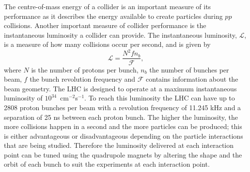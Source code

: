 The centre-of-mass energy of a collider is an important measure of its performance as it describes the energy available to create particles during $pp$ collisions. Another important measure of collider performance is the instantaneous luminosity a collider can provide. The instantaneous luminosity, $\mathcal{L}$, is a measure of how many collisions occur per second, and is given by
\begin{equation}
\mathcal{L} = \frac{N^{2} f n_{b}}{\mathcal{F}},
\label{eq:inst_lumi}
\end{equation}
where $N$ is the number of protons per bunch, $n_{b}$ the number of bunches per beam, $f$ the bunch revolution frequency and $\mathcal{F}$ contains information about the beam geometry. The LHC is designed to operate at a maximum instantaneous luminosity of $10^{34}$~cm$^{-2}$s$^{-1}$. To reach this luminosity the LHC can have up to 2808 proton bunches per beam with a revolution frequency of 11.245 kHz and a separation of 25 ns between each proton bunch. %
The higher the luminosity, the more collisions happen in a second and the more particles can be produced; this is either advantageous or disadvantageous depending on the particle interactions that are being studied.
Therefore the luminosity delivered at each interaction point can be tuned using the quadrupole magnets by altering the shape and the orbit of each bunch to suit the experiments at each interaction point.



